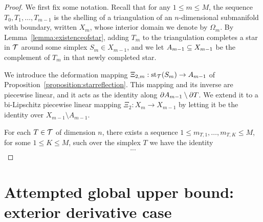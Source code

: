 \documentclass[10pt,a4paper]{article}
\begin{document}
\begin{proof}\color{blue}
    We first fix some notation. 
    Recall that for any $1 \leq m \leq M$, 
    the sequence $T_0, T_1, \dots, T_{m-1}$ is the shelling of a triangulation of an $n$-dimensional submanifold with boundary, 
    written $X_{m}$, whose interior domain we denote by $\Omega_m$. 
    By Lemma~\ref{lemma:existenceofstar}, adding $T_{m}$ to the triangulation completes a star in ${\mathcal T}$ around some simplex $S_{m} \in X_{m-1}$, 
    and we let $A_{m-1} \subseteq X_{m-1}$ be the complement of $T_{m}$ in that newly completed star. 
    
    We introduce the deformation mapping $\Xi_{2,m} : \operatorname{st}_{{\mathcal T}}(S_m) \rightarrow A_{m-1}$ of Proposition~\ref{proposition:starreflection}. 
    This mapping and its inverse are piecewise linear, and it acts as the identity along $\partial A_{m-1} \setminus \partial T$.
    We extend it to a bi-Lipschitz piecewise linear mapping $\Xi_{2} : X_{m} \rightarrow X_{m-1}$ 
    by letting it be the identity over $X_{m-1} \setminus A_{m-1}$.
    
    For each $T \in {\mathcal T}$ of dimension $n$, there exists a sequence $1 \leq m_{T,1},\dots,m_{T,K} \leq M$, for some $1 \leq K \leq M$,
    such over the simplex $T$ we have the identity 
    \begin{align*}
        ...
    \end{align*}
\end{proof}



\section{Attempted global upper bound: exterior derivative case}
\end{document}
